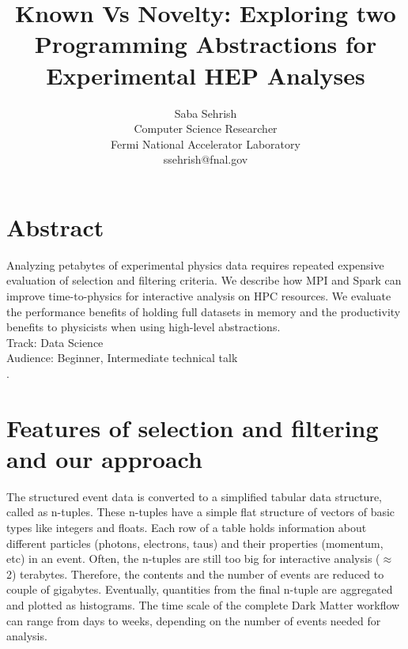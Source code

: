 \documentclass[11pt, twocolumn]{article}
\newcommand{\squeezeup}{\vspace{-5.5mm}}
\begin{document}
\title{Known Vs Novelty: Exploring two Programming Abstractions for Experimental HEP Analyses}
\author{Saba Sehrish \\ Computer Science Researcher\\ Fermi National Accelerator Laboratory \\ ssehrish@fnal.gov}
\date{}
\maketitle

\thispagestyle{empty}

\section*{Abstract}
\squeezeup
Analyzing petabytes of experimental physics data requires repeated expensive evaluation of selection and filtering criteria. We describe how MPI and Spark can improve time-to-physics for interactive analysis on HPC resources. We evaluate the performance benefits of holding full datasets in memory and the productivity benefits to physicists when using high-level abstractions. 
\\
Track: Data Science  \\
Audience: Beginner, Intermediate technical talk \\
\squeezeup
. 
\squeezeup
\section{Features of selection and filtering and our approach}

The structured event data is converted to a simplified tabular data structure, called as n-tuples. 
These n-tuples have a simple flat structure of vectors of basic types like integers and floats. 
Each row of a table holds information about different particles (photons, electrons, taus) and 
their properties (momentum, etc) in an event. Often, the n-tuples are still too big for interactive 
analysis ($\approx$ 2) terabytes. Therefore, the contents and the number of events are 
reduced to couple of gigabytes. Eventually, quantities from the final n-tuple are aggregated 
and plotted as histograms. 
The time scale of the complete Dark Matter workflow 
can range from days to weeks, depending on the number of events needed for analysis.
\end{document}
